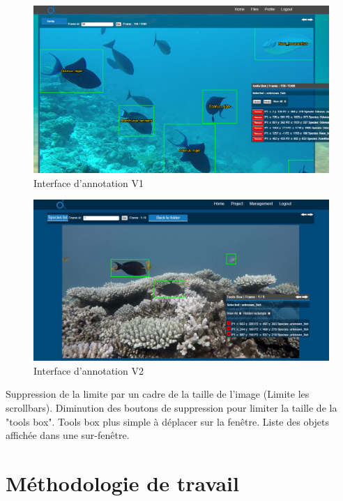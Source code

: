 \documentclass[12pt]{article}
\begin{document}
\begin{figure}[H]
\centering
\includegraphics[width=1\textwidth]{img/OIA_V1/oia_v1_06.png}
 \caption{Interface d'annotation V1}
 \label{fig:anno_v1}
\end{figure}
\begin{figure}[H]
\centering
\includegraphics[width=1\textwidth]{img/OIA_V2/oia_v2_07.png}
 \caption{Interface d'annotation V2}
 \label{fig:anno_v2}
\end{figure}

Suppression de la limite par un cadre de la taille de l'image (Limite les scrollbars).
Diminution des boutons de suppression pour limiter la taille de la "tools box".
Tools box plus simple à déplacer sur la fenêtre. Liste des objets affichée dans une sur-fenêtre.

\newpage

\section{Méthodologie de travail}
\end{document}
